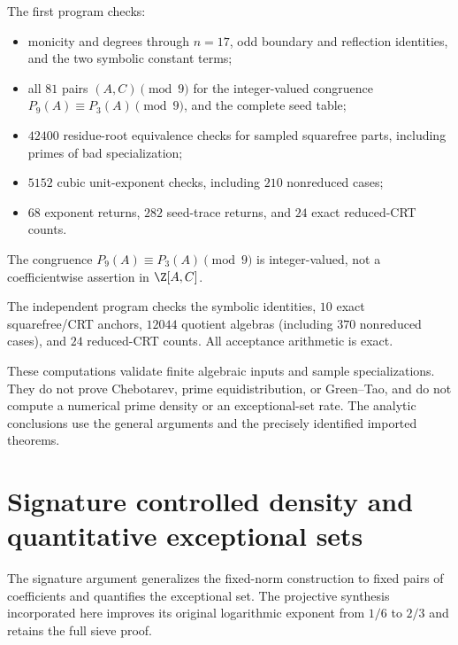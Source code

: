 \documentclass[11pt,a4paper]{article}
\theoremstyle{definition}\newtheorem{definition}[theorem]{Definition}
\theoremstyle{remark}\newtheorem{remark}[theorem]{Remark}
\begin{document}
The first program checks:
\begin{itemize}
\item monicity and degrees through $n=17$, odd boundary and reflection
identities, and the two symbolic constant terms;
\item all $81$ pairs $(A,C)\pmod9$ for the integer-valued congruence
$P_9(A)\equiv P_3(A)\pmod9$, and the complete seed table;
\item $42400$ residue-root equivalence checks for sampled squarefree
parts, including primes of bad specialization;
\item $5152$ cubic unit-exponent checks, including $210$ nonreduced cases;
\item $68$ exponent returns, $282$ seed-trace returns, and $24$
exact reduced-CRT counts.
\end{itemize}
The congruence $P_9(A)\equiv P_3(A)\pmod9$ is integer-valued,
not a coefficientwise assertion in $\Z[A,C]$.

The independent program checks the symbolic identities, $10$ exact
squarefree/CRT anchors, $12044$ quotient algebras (including $370$
nonreduced cases), and $24$ reduced-CRT counts.
All acceptance arithmetic is exact.

These computations validate finite algebraic inputs and sample
specializations. They do not prove Chebotarev, prime equidistribution,
or Green--Tao, and do not compute a numerical prime density or an
exceptional-set rate. The analytic conclusions use the general arguments
and the precisely identified imported theorems.




\endgroup

\section{Signature controlled density and quantitative exceptional sets}\label{src:R11}
The signature argument generalizes the fixed-norm construction to fixed pairs of coefficients and quantifies the exceptional set. The projective synthesis incorporated here improves its original logarithmic exponent from $1/6$ to $2/3$ and retains the full sieve proof.
\medskip
\begingroup
\label{R11:sec:synthesis}
\label{R11:syn:projective-density-improvement}
\end{document}
